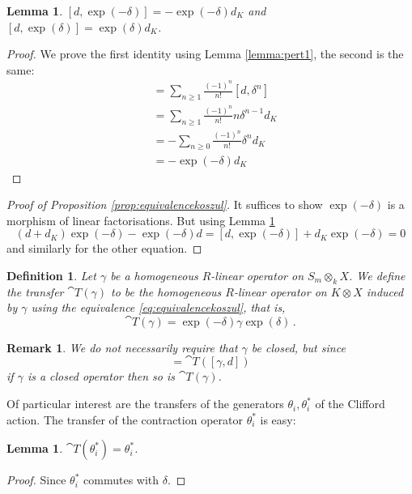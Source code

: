 \documentclass[english,letter paper,12pt,leqno]{article}
\newtheorem{lemma}[theorem]{Lemma}
\theoremstyle{example}
\newtheorem{definition}[theorem]{Definition}
\newtheorem{remark}[theorem]{Remark}
\numberwithin{equation}{section}
\def\be{\begin{equation}}
\def\ee{\end{equation}}
\begin{document}
\begin{lemma}\label{lemma:pert2} $[ d, \exp(-\delta) ] = - \exp(-\delta) d_K$ and $[ d, \exp(\delta) ] = \exp(\delta) d_K$.
\end{lemma}
\begin{proof}
We prove the first identity using Lemma \ref{lemma:pert1}, the second is the same:
\begin{align*}
[d, \exp(-\delta)] &= \sum_{n \ge 1} \frac{(-1)^n}{n!} [ d, \delta^n ]\\
&= \sum_{n \ge 1} \frac{(-1)^n}{n!} n \delta^{n-1} d_K\\
&= - \sum_{n \ge 0} \frac{(-1)^n}{n!} \delta^n d_K\\
&= - \exp(-\delta) d_K
\end{align*}
\end{proof}

\begin{proof}[Proof of Proposition \ref{prop:equivalencekoszul}]
It suffices to show $\exp(-\delta)$ is a morphism of linear factorisations. But using Lemma \ref{lemma:pert2}
\[
(d + d_K) \exp(-\delta) - \exp(-\delta) d = [d, \exp(-\delta)] + d_K \exp(-\delta) = 0
\]
and similarly for the other equation.
\end{proof}

\begin{definition}\label{defn:transfer_contract} Let $\gamma$ be a homogeneous $R$-linear operator on $S_m \otimes_k X$. We define the \textsl{transfer} $\cat{T}(\gamma)$ to be the homogeneous $R$-linear operator on $K \otimes X$ induced by $\gamma$ using the equivalence \eqref{eq:equivalencekoszul}, that is,
\be
\cat{T}(\gamma) = \exp(-\delta) \gamma \exp(\delta)\,.
\ee
\end{definition}

\begin{remark} We do not necessarily require that $\gamma$ be closed, but since
\be
[\cat{T}(\gamma), d_K + d] = \cat{T}( [\gamma, d] )
\ee
if $\gamma$ is a closed operator then so is $\cat{T}(\gamma)$. 
\end{remark}

Of particular interest are the transfers of the generators $\theta_i, \theta_i^*$ of the Clifford action. The transfer of the contraction operator $\theta_i^*$ is easy:

\begin{lemma} $\cat{T}(\theta_i^*) = \theta_i^*$.
\end{lemma}
\begin{proof}
Since $\theta_i^*$ commutes with $\delta$.
\end{proof}
\end{document}
